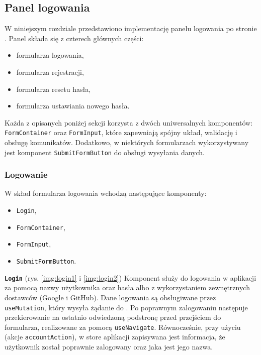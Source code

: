 
\subsection{Panel logowania}
\label{subsec:panel-logowania-frontend}

W niniejszym rozdziale przedstawiono implementację panelu logowania po stronie .
Panel składa się z czterech głównych części:

\begin{itemize}
    \item formularza logowania,
    \item formularza rejestracji,
    \item formularza resetu hasła,
    \item formularza ustawiania nowego hasła.
\end{itemize}

Każda z opisanych poniżej sekcji korzysta z dwóch uniwersalnych komponentów:
\texttt{FormContainer} oraz \texttt{FormInput}, które zapewniają spójny układ, walidację i obsługę komunikatów.
Dodatkowo, w niektórych formularzach wykorzystywany jest komponent \texttt{SubmitFormButton} do obsługi wysyłania danych.
\subsubsection{Logowanie}
\label{subsubsec:logowanie}

W skład formularza logowania wchodzą następujące komponenty:

\begin{itemize}
    \item \texttt{Login},
    \item \texttt{FormContainer},
    \item \texttt{FormInput},
    \item \texttt{SubmitFormButton}.
\end{itemize}

\textbf{\texttt{Login}} (rys. \ref{img:login1} i \ref{img:login2})
Komponent służy do logowania w aplikacji za pomocą nazwy użytkownika oraz hasła albo z wykorzystaniem
zewnętrznych dostawców (Google i GitHub).
Dane logowania są obsługiwane przez  \texttt{useMutation}, który wysyła żądanie
do .
Po poprawnym zalogowaniu następuje przekierowanie na ostatnio odwiedzoną podstronę przed przejściem
do formularza, realizowane za pomocą \texttt{useNavigate}.
Równocześnie, przy użyciu  (akcje \texttt{accountAction}), w store aplikacji
zapisywana jest informacja, że użytkownik został poprawnie zalogowany oraz jaka jest jego nazwa.

